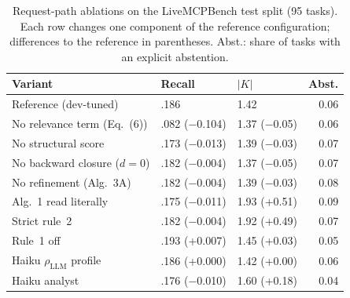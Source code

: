\begin{table}[t]
\caption{Request-path ablations on the LiveMCPBench test split (95 tasks). Each row changes one component of the
reference configuration; differences to the reference in parentheses. Abst.: share of tasks with an explicit
abstention.}
\label{tab:eval-ablation}
\centering\footnotesize\setlength{\tabcolsep}{3pt}
\begin{tabular}{@{}lllr@{}}
\toprule
Variant & Recall & $|K|$ & Abst.\\
\midrule
Reference (dev-tuned) & .186 & 1.42 & 0.06 \\
\midrule
No relevance term (Eq.~(6)) & .082 ($-$0.104) & 1.37 ($-$0.05) & 0.06 \\
No structural score & .173 ($-$0.013) & 1.39 ($-$0.03) & 0.07 \\
No backward closure ($d=0$) & .182 ($-$0.004) & 1.37 ($-$0.05) & 0.07 \\
No refinement (Alg.~3A) & .182 ($-$0.004) & 1.39 ($-$0.03) & 0.08 \\
Alg.~1 read literally & .175 ($-$0.011) & 1.93 (+0.51) & 0.09 \\
Strict rule~2 & .182 ($-$0.004) & 1.92 (+0.49) & 0.07 \\
Rule~1 off & .193 (+0.007) & 1.45 (+0.03) & 0.05 \\
Haiku $\rho_{\mathrm{LLM}}$ profile & .186 (+0.000) & 1.42 (+0.00) & 0.06 \\
Haiku analyst & .176 ($-$0.010) & 1.60 (+0.18) & 0.04 \\
\bottomrule
\end{tabular}
\end{table}
